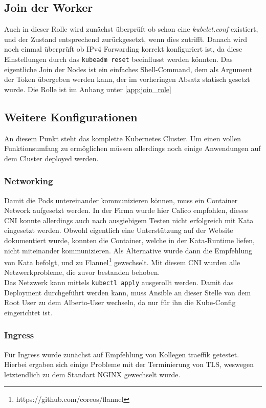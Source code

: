 \subsection{Join der Worker}
Auch in dieser Rolle wird zunächst überprüft ob schon eine \textit{kubelet.conf} existiert, und der Zustand entsprechend zurückgesetzt, wenn dies zutrifft.
Danach wird noch einmal überprüft ob IPv4 Forwarding korrekt konfiguriert ist, da diese Einstellungen durch das \texttt{kubeadm\ reset} beeinflusst werden könnten.
Das eigentliche Join der Nodes ist ein einfaches Shell-Command, dem als Argument der Token übergeben werden kann, der im vorheringen Absatz statisch gesetzt wurde.
Die Rolle ist im Anhang unter \ref{app:join_role}


\subsection{Weitere Konfigurationen}
An diesem Punkt steht das komplette Kubernetes Cluster.
Um einen vollen Funktionsumfang zu ermöglichen müssen allerdings noch einige Anwendungen auf dem Cluster deployed werden.

\subsubsection{Networking}
Damit die Pods untereinander kommunizieren können, muss ein Container Network aufgesetzt werden.
In der Firma wurde hier Calico empfohlen, dieses \ac{CNI} konnte allerdings auch nach ausgiebigem Testen nicht erfolgreich mit Kata eingesetzt werden.
Obwohl eigentlich eine Unterstützung auf der Website dokumentiert wurde, konnten die Container, welche in der Kata-Runtime liefen, nicht miteinander kommunizieren.
Als Alternative wurde dann die Empfehlung von Kata befolgt, und zu Flannel\footnote{https://github.com/coreos/flannel} gewechselt. 
Mit diesem \ac{CNI} wurden alle Netzwerkprobleme, die zuvor bestanden behoben.
\\
Das Netzwerk kann mittels \texttt{kubectl apply} ausgerollt werden.
Damit das Deployment durchgeführt werden kann, muss Ansible an dieser Stelle von dem Root User zu dem Alberto-User wechseln, da nur für ihn die Kube-Config eingerichtet ist. 

\subsubsection{Ingress}
Für Ingress wurde zunächst auf Empfehlung von Kollegen traeffik getestet. 
Hierbei ergaben sich einige Probleme mit der Terminierung von \ac{TLS}, weswegen letztendlich zu dem Standart NGINX gewechselt wurde.

